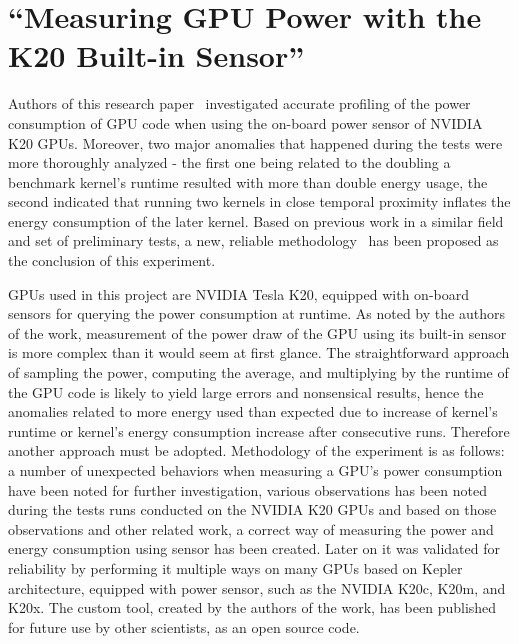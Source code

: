 \section{“Measuring GPU Power with the K20 Built-in Sensor”}

Authors of this research paper~\cite{State_of_the_Art_Article_3}
investigated accurate profiling of the power consumption of
GPU code when using the on-board power sensor of NVIDIA K20 GPUs.
Moreover, two major anomalies that happened during the tests
were more thoroughly analyzed - the first one being related to
the doubling a benchmark kernel's runtime resulted with more
than double energy usage, the second indicated that running two
kernels in close temporal proximity inflates the energy
consumption of the later kernel. Based on previous work in
a similar field and set of preliminary tests, a new, reliable
methodology~\cite{K20Power} has been proposed as the conclusion
of this experiment.

GPUs used in this project are NVIDIA Tesla K20, equipped with
on-board sensors for querying the power consumption at runtime.
As noted by the authors of the work, measurement of the power draw
of the GPU using its built-in sensor is more complex than it would
seem at first glance. The straightforward approach of sampling the
power, computing the average, and multiplying by the runtime of the
GPU code is likely to yield large errors and nonsensical results,
hence the anomalies related to more energy used than expected due
to increase of kernel's runtime or kernel's energy consumption
increase after consecutive runs. Therefore another approach must
be adopted. Methodology of the experiment is as follows: a number
of unexpected behaviors when measuring a GPU's power consumption
have been noted for further investigation, various observations
has been noted during the tests runs conducted on the NVIDIA K20
GPUs and based on those observations and other related work,
a correct way of measuring the power and energy consumption using
sensor has been created. Later on it was validated for reliability
by performing it multiple ways on many GPUs based on Kepler
architecture, equipped with power sensor, such as the NVIDIA K20c,
K20m, and K20x. The custom tool, created by the authors of the
work, has been published for future use by other scientists, as an
open source code.

